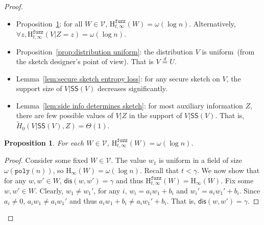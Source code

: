 \documentclass[11pt]{article}
\newcommand{\lemref}[1]{\mbox{Lemma~\ref{#1}}}
\newcommand{\propref}[1]{\mbox{Proposition~\ref{#1}}}
\newcommand{\class}[1]{{\ensuremath{\mathsf{#1}}}}
\newcommand{\sketch}{\ensuremath{\class{SS}}\xspace}
\newcommand{\dis}{\ensuremath{\mathsf{dis}}}
\newcommand{\poly}{\ensuremath{\mathtt{poly}}\xspace}
\newcommand{\Hoo}{\mathrm{H}_\infty}
\newcommand{\Hav}{\tilde{\mathrm{H}}_\infty}
\newcommand{\Hfuzz}{\mathrm{H}^{\mathtt{fuzz}}_{t,\infty}}
\newtheorem{proposition}[theorem]{Proposition}
\begin{document}
\begin{proof}
\begin{itemize}
\item \propref{prop:each element good}: for all $W\in \mathcal{V}$, $\Hfuzz(W) = \omega (\log n)$. Alternatively, $\forall z, \Hfuzz(V | Z=z) = \omega(\log n)$.
\item \propref{prop:distribution uniform}: the distribution $V$ is uniform~(from the sketch designer's point of view).  That is $V\overset{d}=U$.
\item \lemref{lem:secure sketch entropy loss}: for any secure sketch on $V$, the support size of $V | \sketch(V)$ decreases significantly.
\item \lemref{lem:side info determines sketch}:  for most auxiliary information $Z$, there are few possible values of $V|Z$ in the support of $V | \sketch(V)$.  That is, $\tilde{H}_0(V | \sketch(V), Z) = \Theta(1)$.
\end{itemize}
\begin{proposition} 
\label{prop:each element good} For each $W\in\mathcal{V}$, $\Hfuzz(W) = \omega(\log n)$.
\end{proposition}
\begin{proof}
Consider some fixed $W\in\mathcal{V}$.  The value $w_1$ is uniform in a field of size $\omega(\poly(n))$, so $\Hoo(W) =\omega(\log n)$.  Recall that $t< \gamma$.  We now show that for any $w, w'\in W$, $\dis(w, w') = \gamma$ and thus $\Hfuzz(W) = \Hoo(W)$.  Fix some $w, w'\in W$.  Clearly, $w_1 \neq w_1'$, for any $i$, $w_i = a_i w_1 + b_i$ and $w_i' = a_i w_1' + b_i$.  Since $a_i\neq 0$, $a_iw_1 \neq a_iw_1'$ and thus $a_iw_1+b_i \neq a_iw_1'+b_i$.  That is, $\dis (w, w')  =\gamma$.
\end{proof}


\end{proof}
\end{document}
